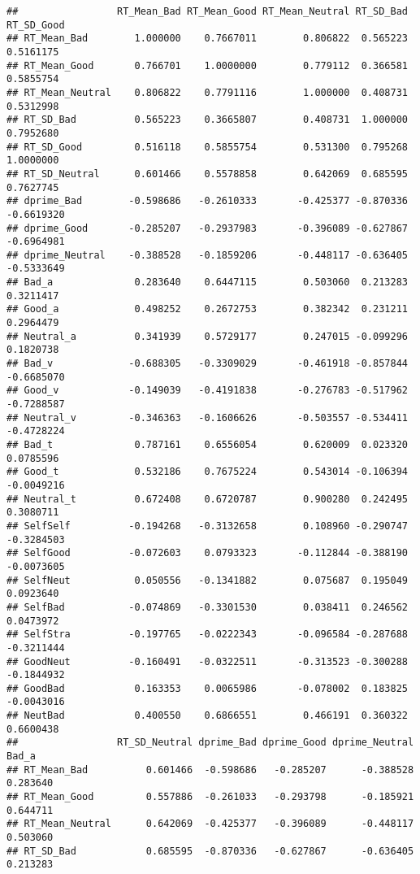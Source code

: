 \documentclass[man]{apa6}
\begin{document}
\begin{verbatim}
##                 RT_Mean_Bad RT_Mean_Good RT_Mean_Neutral RT_SD_Bad RT_SD_Good
## RT_Mean_Bad        1.000000    0.7667011        0.806822  0.565223  0.5161175
## RT_Mean_Good       0.766701    1.0000000        0.779112  0.366581  0.5855754
## RT_Mean_Neutral    0.806822    0.7791116        1.000000  0.408731  0.5312998
## RT_SD_Bad          0.565223    0.3665807        0.408731  1.000000  0.7952680
## RT_SD_Good         0.516118    0.5855754        0.531300  0.795268  1.0000000
## RT_SD_Neutral      0.601466    0.5578858        0.642069  0.685595  0.7627745
## dprime_Bad        -0.598686   -0.2610333       -0.425377 -0.870336 -0.6619320
## dprime_Good       -0.285207   -0.2937983       -0.396089 -0.627867 -0.6964981
## dprime_Neutral    -0.388528   -0.1859206       -0.448117 -0.636405 -0.5333649
## Bad_a              0.283640    0.6447115        0.503060  0.213283  0.3211417
## Good_a             0.498252    0.2672753        0.382342  0.231211  0.2964479
## Neutral_a          0.341939    0.5729177        0.247015 -0.099296  0.1820738
## Bad_v             -0.688305   -0.3309029       -0.461918 -0.857844 -0.6685070
## Good_v            -0.149039   -0.4191838       -0.276783 -0.517962 -0.7288587
## Neutral_v         -0.346363   -0.1606626       -0.503557 -0.534411 -0.4728224
## Bad_t              0.787161    0.6556054        0.620009  0.023320  0.0785596
## Good_t             0.532186    0.7675224        0.543014 -0.106394 -0.0049216
## Neutral_t          0.672408    0.6720787        0.900280  0.242495  0.3080711
## SelfSelf          -0.194268   -0.3132658        0.108960 -0.290747 -0.3284503
## SelfGood          -0.072603    0.0793323       -0.112844 -0.388190 -0.0073605
## SelfNeut           0.050556   -0.1341882        0.075687  0.195049  0.0923640
## SelfBad           -0.074869   -0.3301530        0.038411  0.246562  0.0473972
## SelfStra          -0.197765   -0.0222343       -0.096584 -0.287688 -0.3211444
## GoodNeut          -0.160491   -0.0322511       -0.313523 -0.300288 -0.1844932
## GoodBad            0.163353    0.0065986       -0.078002  0.183825 -0.0043016
## NeutBad            0.400550    0.6866551        0.466191  0.360322  0.6600438
##                 RT_SD_Neutral dprime_Bad dprime_Good dprime_Neutral     Bad_a
## RT_Mean_Bad          0.601466  -0.598686   -0.285207      -0.388528  0.283640
## RT_Mean_Good         0.557886  -0.261033   -0.293798      -0.185921  0.644711
## RT_Mean_Neutral      0.642069  -0.425377   -0.396089      -0.448117  0.503060
## RT_SD_Bad            0.685595  -0.870336   -0.627867      -0.636405  0.213283

\end{verbatim}
\end{document}

